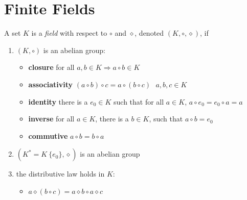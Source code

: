 \chapter{Finite Fields}

\begin{definition}[Fields]
A set $K$ is a \emph{field} with respect to $\circ$ and $\diamond$, denoted $(K, \circ, \diamond)$, if
\begin{enumerate}[label=\roman*]
\item $(K,\circ)$ is an abelian group:
\begin{itemize}
\item \textbf{closure} for all $a, b \in K \Rightarrow a \circ b \in K$
\item \textbf{associativity} $(a \circ b) \circ c = a \circ (b \circ c) \,\,\,\, a,b,c \in K$
\item \textbf{identity} there is a $e_0 \in K$ such that for all $a \in K$, $a \circ e_0 = e_0 \circ a = a$
\item \textbf{inverse} for all $a \in K$, there is a $b \in K$, such that $a \circ b = e_0$
\item \textbf{commutive} $a \circ b = b \circ a$
\end{itemize}
\item $(K^{\ast} =K \ \{e_0\}, \diamond)$ is an abelian group
\item the distributive law holds in $K$:
\begin{itemize}
\item[] $a \diamond (b \circ c) = a \diamond b \circ a \diamond c$
\end{itemize}
\end{enumerate}
\end{definition}

